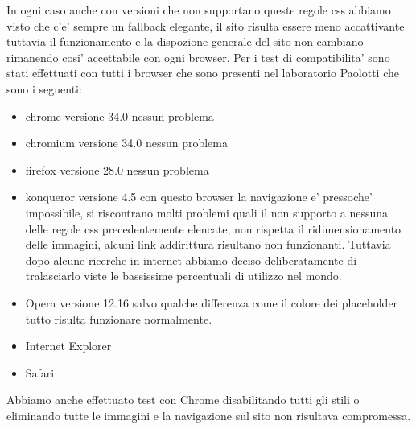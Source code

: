 In ogni caso anche con versioni che non supportano queste regole css abbiamo visto che c'e' sempre un fallback elegante, il sito risulta essere meno accattivante tuttavia il funzionamento e la dispozione generale del sito non cambiano rimanendo cosi' accettabile con ogni browser.\newline
Per i test di compatibilita' sono stati effettuati con tutti i browser che sono presenti nel laboratorio Paolotti che sono i seguenti:
\begin{itemize}
	\item chrome versione 34.0 nessun problema
	\item chromium versione 34.0 nessun problema
	\item firefox versione 28.0 nessun problema
	\item konqueror versione 4.5 con questo browser la navigazione e' pressoche' impossibile, si riscontrano molti problemi quali il non supporto a nessuna delle regole css precedentemente elencate, non rispetta il ridimensionamento delle immagini, alcuni link addirittura risultano non funzionanti.
Tuttavia dopo alcune ricerche in internet abbiamo deciso deliberatamente di tralasciarlo viste le bassissime percentuali di utilizzo nel mondo.
	\item Opera versione 12.16 salvo qualche differenza come il colore dei placeholder tutto risulta funzionare normalmente.
	\item Internet Explorer
	\item Safari
\end{itemize}

Abbiamo anche effettuato test con Chrome disabilitando tutti gli stili o eliminando tutte le immagini e la navigazione sul sito non risultava compromessa.
